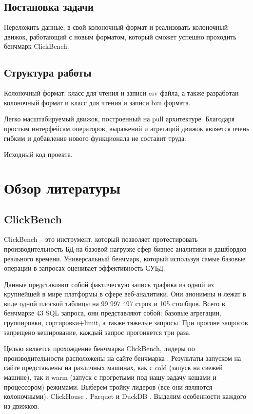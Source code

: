 \documentclass[a4paper,12pt]{extarticle}
\begin{document}
\subsection{Постановка задачи}
Переложить данные, в свой колоночный формат и реализовать колоночный движок,
работающий с новым форматом, который сможет
успешно проходить бенчмарк ClickBench.

\subsection{Структура работы}
Колоночный формат:
класс для чтения и записи csv файла, а также разработан
колоночный формат и класс для чтения и записи bzn формата.

Легко масштабируемый движок, построенный на pull архитектуре.
Благодаря простым интерфейсам операторов,
выражений и агрегаций движок является очень гибким и добавление нового функционала не
составит труда.

Исходный код проекта\cite{GitHub}.


\section{Обзор литературы}
\subsection{ClickBench}
ClickBench \cite{clickbench} -- это инструмент, который позволяет протестировать
производительность БД на базовой нагрузке сфер бизнес аналитики и дашбордов
реального времени. Универсальный бенчмарк, который используя самые базовые
операции в запросах оценивает эффективность СУБД.

Данные представляют собой фактическую запись трафика из одной из крупнейшей в мире
платформы в сфере веб-аналитики. Они анонимны и лежат в виде одной плоской таблицы
на 99 997 497 строк и 105 столбцов. Всего в бенчмарке 43 SQL запроса, они
представляют собой: базовые агрегации, группировки, сортировки+limit, а также
тяжелые запросы. При прогоне запросов запрещено кеширование, каждый запрос
прогоняется три раза.

Целью является прохождение бенчмарка ClickBench,
лидеры по производительности расположены на сайте бенчмарка \cite{clickbench}. Результаты
запуском на сайте представлены на различных машинах, как с cold (запуск на свежей
машине), так и warm (запуск с прогретыми под нашу задачу кешами и процессором)
режимами. Выберем тройку лидеров (все они являются колоночными).
ClickHouse \cite{clickhouse}, Parquet \cite{parquet} и DuckDB \cite{duckdb}.
Выделим особенности каждого из движков.
\end{document}
